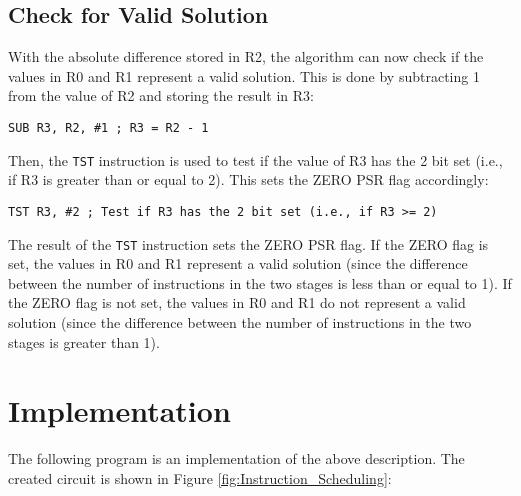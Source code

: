 \subsection{Check for Valid Solution}

With the absolute difference stored in R2, the algorithm can now check if the values in R0 and R1 represent a valid solution. This is done by subtracting 1 from the value of R2 and storing the result in R3:

\begin{verbatim}
SUB R3, R2, #1 ; R3 = R2 - 1
\end{verbatim}

Then, the \texttt{TST} instruction is used to test if the value of R3 has the 2 bit set (i.e., if R3 is greater than or equal to 2). This sets the ZERO PSR flag accordingly:

\begin{verbatim}
TST R3, #2 ; Test if R3 has the 2 bit set (i.e., if R3 >= 2)
\end{verbatim}

The result of the \texttt{TST} instruction sets the ZERO PSR flag. If the ZERO flag is set, the values in R0 and R1 represent a valid solution (since the difference between the number of instructions in the two stages is less than or equal to 1). If the ZERO flag is not set, the values in R0 and R1 do not represent a valid solution (since the difference between the number of instructions in the two stages is greater than 1).



\section{Implementation}

The following program is an implementation of the above description. The created circuit is shown in Figure \ref{fig:Instruction_Scheduling}:


